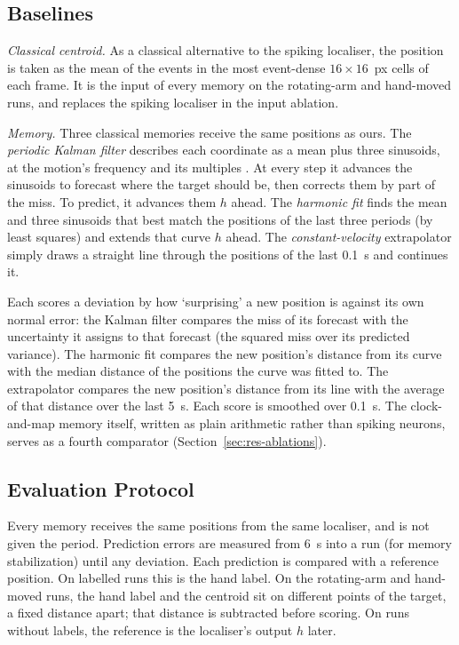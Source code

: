 \documentclass[conference]{IEEEtran}
\begin{document}
\subsection{Baselines}
\label{sec:baselines}
\emph{Classical centroid.} As a classical alternative to the spiking localiser, the position is taken as the mean of the events in the most event-dense $16\times16$~px cells of each frame. It is the input of every memory on the rotating-arm and hand-moved runs, and replaces the spiking localiser in the input ablation.

\emph{Memory.} Three classical memories receive the same positions as ours. The \emph{periodic Kalman filter} \cite{Kalman1960A} describes each coordinate as a mean plus three sinusoids, at the motion's frequency and its multiples \cite{Harvey1990Forecasting}. At every step it advances the sinusoids to forecast where the target should be, then corrects them by part of the miss. To predict, it advances them $h$ ahead. The \emph{harmonic fit} finds the mean and three sinusoids that best match the positions of the last three periods (by least squares) and extends that curve $h$ ahead. The \emph{constant-velocity} extrapolator simply draws a straight line through the positions of the last 0.1~s and continues it.

Each scores a deviation by how `surprising' a new position is against its own normal error: the Kalman filter compares the miss of its forecast with the uncertainty it assigns to that forecast (the squared miss over its predicted variance). The harmonic fit compares the new position's distance from its curve with the median distance of the positions the curve was fitted to. The extrapolator compares the new position's distance from its line with the average of that distance over the last 5~s. Each score is smoothed over 0.1~s. The clock-and-map memory itself, written as plain arithmetic rather than spiking neurons, serves as a fourth comparator (Section~\ref{sec:res-ablations}).

\subsection{Evaluation Protocol}
\label{sec:protocol}
Every memory receives the same positions from the same localiser, and is not given the period. Prediction errors are measured from 6~s into a run (for memory stabilization) until any deviation. Each prediction is compared with a reference position. On labelled runs this is the hand label. On the rotating-arm and hand-moved runs, the hand label and the centroid sit on different points of the target, a fixed distance apart; that distance is subtracted before scoring. On runs without labels, the reference is the localiser's output $h$ later.
\end{document}

